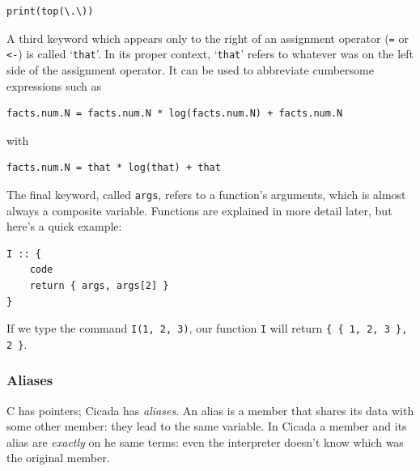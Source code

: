 \documentclass{article}
\newenvironment{code}{
       \begin{list}{}{
               \setlength{\leftmargin}{.4in}
               \setlength{\rightmargin}{0in}
               \setlength{\topsep}{.2in}
       }
       \small
       \item[] }
       { \end{list}   }
\begin{document}
\begin{code} \begin{verbatim}
print(top(\.\))
\end{verbatim} \end{code}

A third keyword which appears only to the right of an assignment operator (\verb#=# or \verb#<-#) is called `\verb#that#'.  In its proper context, `\verb#that#' refers to whatever was on the left side of the assignment operator.  It can be used to abbreviate cumbersome expressions such as

\begin{code} \begin{verbatim}
facts.num.N = facts.num.N * log(facts.num.N) + facts.num.N
\end{verbatim} \end{code}

\noindent with

\begin{code} \begin{verbatim}
facts.num.N = that * log(that) + that
\end{verbatim} \end{code}

The final keyword, called \verb#args#, refers to a function's arguments, which is almost always a composite variable.  Functions are explained in more detail later, but here's a quick example:

\begin{code} \begin{verbatim}
I :: {
    code
    return { args, args[2] }
}
\end{verbatim} \end{code}

\noindent If we type the command \verb#I(1, 2, 3)#, our function \verb#I# will return \verb#{ { 1, 2, 3 }, 2 }#.




\subsubsection{Aliases} 

C has pointers; Cicada has \emph{aliases}.  An alias is a member that shares its data with some other member:  they lead to the same variable.  In Cicada a member and its alias are \emph{exactly} on he same terms:  even the interpreter doesn't know which was the original member.
\end{document}
